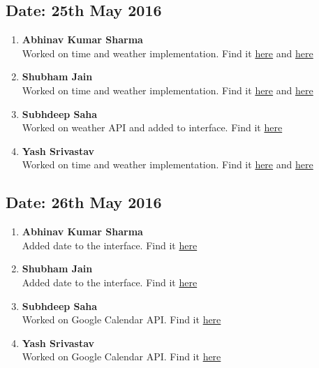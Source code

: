 \documentclass[11pt,a4paper]{article}
\begin{document}
    \subsection{Date: 25th May 2016}
      \begin{enumerate}
        \item
          \textbf{Abhinav Kumar Sharma\\ }
            Worked on time and weather implementation. Find it \href{https://github.com/11000011/Smart-Mirror/pull/1}{here} and \href{https://github.com/11000011/Smart-Mirror/pull/2}{here}
        \item
          \textbf{Shubham Jain}\\ 
            Worked on time and weather implementation. Find it \href{https://github.com/11000011/Smart-Mirror/pull/1}{here} and \href{https://github.com/11000011/Smart-Mirror/pull/2}{here}
        \item
          \textbf{Subhdeep Saha}\\ 
            Worked on weather API and added to interface. Find it \href{https://github.com/11000011/Smart-Mirror/pull/2}{here}
        \item
          \textbf{Yash Srivastav}\\ 
            Worked on time and weather implementation. Find it \href{https://github.com/11000011/Smart-Mirror/pull/1}{here} and \href{https://github.com/11000011/Smart-Mirror/pull/2}{here}
      \end{enumerate}
    \subsection{Date: 26th May 2016}
      \begin{enumerate}
        \item
          \textbf{Abhinav Kumar Sharma\\ }
            Added date to the interface. Find it \href{https://github.com/11000011/Smart-Mirror/pull/3}{here}
        \item
          \textbf{Shubham Jain}\\ 
            Added date to the interface. Find it \href{https://github.com/11000011/Smart-Mirror/pull/3}{here}
        \item
          \textbf{Subhdeep Saha}\\ 
            Worked on Google Calendar API. Find it \href{https://github.com/11000011/Smart-Mirror/pull/4}{here}
        \item
          \textbf{Yash Srivastav}\\ 
            Worked on Google Calendar API. Find it \href{https://github.com/11000011/Smart-Mirror/pull/4}{here}
      \end{enumerate}
\end{document}
